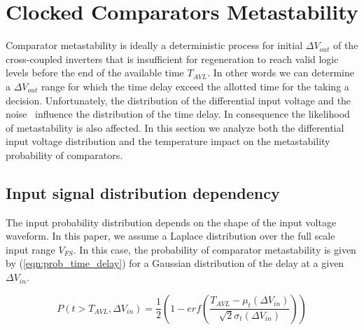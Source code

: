 
\chapter{Clocked Comparators Metastability}
\label{app:comp-metastability}

Comparator metastability is ideally a deterministic process for initial $\Delta V_{out}$ of the cross-coupled inverters that is insufficient for regeneration to reach valid logic levels before the end of the available time $T_{AVL}$. In other words we can determine a $\Delta V_{out}$ range for which the time delay exceed the allotted time for the taking a decision.
  Unfortunately, the distribution of the differential input voltage and the noise~\cite{noise_comp_sepke_2009} influence the distribution of the time delay. In consequence the likelihood of metastability is also affected. In this section we analyze both the differential input voltage distribution and the temperature impact on the metastability probability of comparators.

\section{Input signal distribution dependency}
The input probability distribution depends on the shape of the input voltage waveform. In this paper, we assume a Laplace distribution over the full scale input range $V_{FS}$. In this case, the probability of comparator metastability is given by (\ref{eqn:prob_time_delay}) for a Gaussian distribution of the delay at a given $\Delta V_{in}$.


\begin{equation}
P(t > T_{AVL}, \Delta V_{in}) = \frac{1}{2}\left(1-erf\left(\frac{T_{AVL}-\mu_{t}(\Delta V_{in})}{\sqrt{2}\sigma_{t}(\Delta V_{in})}\right)\right)
\label{eqn:prob_time_delay}
\end{equation}

